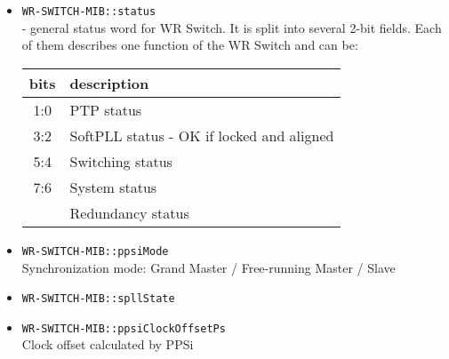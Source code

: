 \begin{itemize}[leftmargin=0pt]
	\item [] \texttt{WR-SWITCH-MIB::status}\\ - general status word for WR Switch.
		It is split into several 2-bit fields. Each of them describes one
		function of the WR Switch and can be:
		\vspace{12pt}
		\begin{tabular}{|c|l|}
			\hline
			bits & description\\
			\hline \hline
			1:0 & PTP status\\
			3:2 & SoftPLL status - OK if locked and aligned\\
			5:4 & Switching status\\
			7:6 & System status\\
			 & Redundancy status\\
			\hline
		\end{tabular}

	\item [] \texttt{WR-SWITCH-MIB::ppsiMode}\\
		Synchronization mode: Grand Master / Free-running Master / Slave
	\item [] \texttt{WR-SWITCH-MIB::spllState}\\

	\item [] \texttt{WR-SWITCH-MIB::ppsiClockOffsetPs}\\
		Clock offset calculated by PPSi


\end{itemize}
